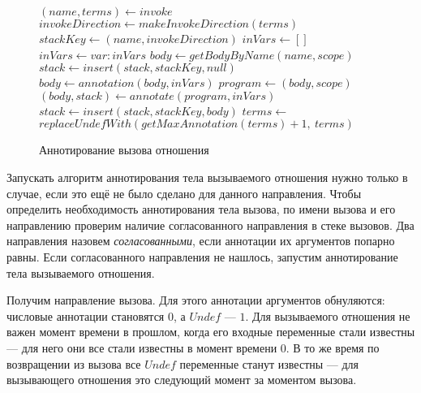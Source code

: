 \begin{figure}[h!]
  \begin{center}
  \begin{minipage}{1\textwidth}
\begin{algorithm}[H]
  \begin{algorithmic}
      \State $(name, terms) \gets invoke$
      \State $invokeDirection \gets makeInvokeDirection(terms)$
      \State $stackKey \gets (name, invokeDirection)$
        \State $inVars \gets []$
            \State $inVars \gets var : inVars$
          \EndIf
        \EndFor
        \State $body \gets getBodyByName(name, scope)$
        \State $stack \gets insert(stack, stackKey, null)$
        \State $body \gets annotation(body, inVars)$
        \State $program \gets (body, scope)$
        \State $(body, stack) \gets annotate(program, inVars)$
        \State $stack \gets insert(stack, stackKey, body)$
      \EndIf
      \State $terms \gets$ \\ \hspace{2em} $replaceUndefWith(getMaxAnnotation(terms) + 1,~terms)$
       \EndReturn
    \EndFunction
  \end{algorithmic}
\end{algorithm}
  \end{minipage}
  \end{center}
  \caption{Аннотирование вызова отношения}
  \label{alg:annotateInvoke}
\end{figure}

Запускать алгоритм аннотирования тела вызываемого отношения нужно только в случае, если это ещё не было сделано для данного направления.
Чтобы определить необходимость аннотирования тела вызова, по имени вызова и его направлению проверим наличие согласованного направления в стеке вызовов.
Два направления назовем \emph{согласованными}, если аннотации их аргументов попарно равны.
Если согласованного направления не нашлось, запустим аннотирование тела вызываемого отношения.

Получим направление вызова.
Для этого аннотации аргументов обнуляются: числовые аннотации становятся $0$, а $Undef$ --- $1$.
Для вызываемого отношения не важен момент времени в прошлом, когда его входные переменные стали известны --- для него они все стали известны в момент времени $0$.
В то же время по возвращении из вызова все $Undef$ переменные станут известны --- для вызывающего отношения это следующий момент за моментом вызова.

